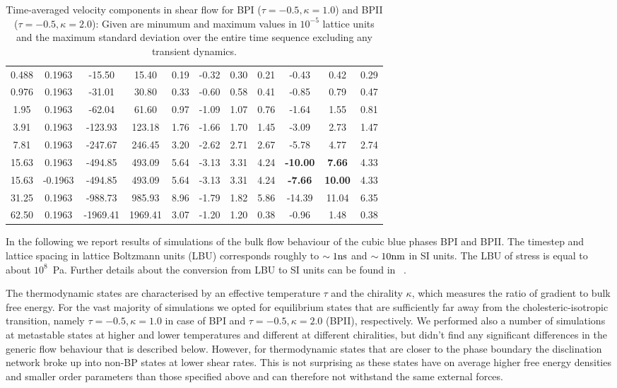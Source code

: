 \documentclass[aps,pre,reprint,superscriptaddress, twocolumn]{revtex4}
\begin{document}
\begin{table}[htpb]
\begin{tabular}{|c|| c || c |c |c||c| c| c||c| c| c|}
0.488 &0.1963 &-15.50 &15.40 &0.19 &-0.32 &0.30 &0.21 &-0.43 &0.42 &0.29 \\
0.976 &0.1963 &-31.01 &30.80 &0.33 &-0.60 &0.58 &0.41 &-0.85 &0.79 &0.47 \\
1.95 & 0.1963 &-62.04  &61.60 & 0.97 & -1.09 &1.07 & 0.76 & -1.64 & 1.55 & 0.81\\
3.91 & 0.1963 &-123.93 &123.18 & 1.76 &-1.66 &1.70 & 1.45 &-3.09& 2.73 &1.47\\
7.81 &0.1963  &-247.67 &246.45 & 3.20 &-2.62 &2.71 & 2.67 &-5.78 & 4.77 &2.74\\
15.63 &0.1963 &-494.85 &493.09 & 5.64 &-3.13 &3.31 &4.24 &\bf{-10.00} & \bf{7.66} &4.33\\
15.63 &-0.1963&-494.85 &493.09 & 5.64 & -3.13 &3.31 &4.24 &\bf{-7.66} & \bf{10.00} &4.33\\
31.25 &0.1963 &-988.73 &985.93 &8.96  &-1.79 &1.82 &5.86 &-14.39 & 11.04 &6.35\\
62.50 &0.1963 & -1969.41  & 1969.41 & 3.07 & -1.20 & 1.20 & 0.38 &-0.96 & 1.48 &0.38 \\
\hline
\end{tabular}
\caption{Time-averaged velocity components in shear flow for BPI ($\tau=-0.5, \kappa=1.0$) and BPII ($\tau=-0.5, \kappa=2.0$): Given are minumum and maximum values in $10^{-5}$ lattice units and the maximum standard deviation over the entire time sequence excluding any transient dynamics.}
\label{tab1}
\end{table}

In the following we report results of simulations of the bulk flow behaviour of the cubic blue 
phases BPI and BPII. 
The timestep and lattice spacing in lattice Boltzmann units (LBU) corresponds roughly to
$\sim 1 {\rm ns}$ and $\sim 10{\rm nm}$ in SI units. The LBU of stress
is equal to about $10^8$~Pa. Further details about the conversion 
from LBU to SI units can be found in ~\cite{Henrich:2011a,Henrich:2010b}.

The thermodynamic states are characterised by an effective temperature 
$\tau$ and the chirality $\kappa$, which measures the ratio of gradient to bulk free energy.
For the vast majority of simulations we opted for equilibrium states that are sufficiently 
far away from the cholesteric-isotropic transition, namely
$\tau=-0.5, \kappa=1.0$ in case of BPI and $\tau=-0.5, \kappa=2.0$ (BPII), respectively.
We performed also a number of simulations at metastable states at higher and lower temperatures 
and different at different chiralities, but didn't find any significant differences in the 
generic flow behaviour that is described below.
However, for thermodynamic states that are closer to the phase boundary the disclination 
network broke up into non-BP states at lower shear rates. This is not surprising as
these states have on average higher free energy densities and smaller order parameters
than those specified above and can therefore not withstand the same external forces.
\end{document}
